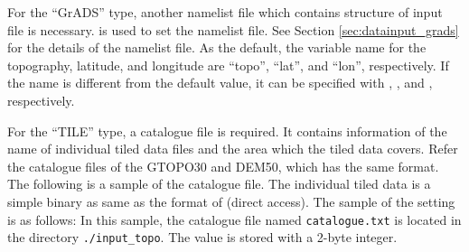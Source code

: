 For the ``GrADS'' type, another namelist file which contains structure of input file is necessary.
 is used to set the namelist file.
See Section \ref{sec:datainput_grads} for the details of the namelist file.
As the default, the variable name for the topography, latitude, and longitude are ``topo'', ``lat'', and ``lon'', respectively.
If the name is different from the default value, it can be specified with , , and , respectively.



For the ``TILE'' type, a catalogue file is required.
It contains information of the name of individual tiled data files and the area which the tiled data covers.
Refer the catalogue files of the GTOPO30 and DEM50, which has the same format.
The following is a sample of the catalogue file.
The individual tiled data is a simple binary as same as the format of \grads (direct access).
The sample of the setting is as follows:
In this sample, the catalogue file named \verb|catalogue.txt| is located in the directory \verb|./input_topo|.
The value is stored with a 2-byte integer.
